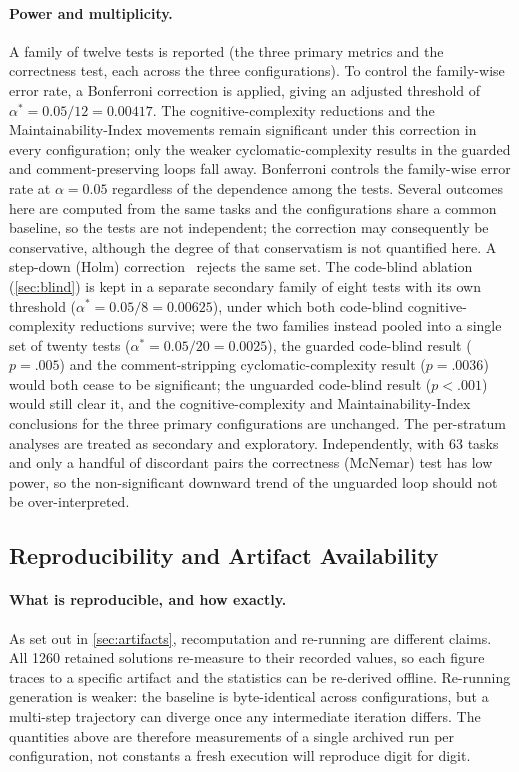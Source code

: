 \paragraph{Power and multiplicity.} A family of twelve tests is
reported (the three primary metrics and the correctness test, each across the
three configurations). To control the family-wise error rate, a Bonferroni
correction is applied, giving an adjusted threshold of
$\alpha^\ast = 0.05/12 = 0.00417$. The cognitive-complexity reductions and the
Maintainability-Index movements remain significant under this correction in every
configuration; only the weaker cyclomatic-complexity results in the guarded and
comment-preserving loops fall away. Bonferroni controls the family-wise error rate
at $\alpha = 0.05$ regardless of the dependence among the tests. Several outcomes
here are computed from the same tasks and the configurations share a common
baseline, so the tests are not independent; the correction may consequently be
conservative, although the degree of that conservatism is not quantified here. A
step-down (Holm) correction~\citep{holm1979} rejects the
same set. The
code-blind ablation (\cref{sec:blind}) is kept in a separate secondary family of
eight tests with its own threshold ($\alpha^\ast = 0.05/8 = 0.00625$), under
which both code-blind cognitive-complexity reductions survive; were the two
families instead pooled into a single set of twenty tests
($\alpha^\ast = 0.05/20 = 0.0025$), the guarded code-blind result ($p=.005$) and the
comment-stripping cyclomatic-complexity result ($p=.0036$) would both cease to be significant; the unguarded code-blind result ($p<.001$)
would still clear it, and the cognitive-complexity and Maintainability-Index
conclusions for the three primary configurations are unchanged. The per-stratum
analyses are treated as secondary and exploratory. Independently, with 63 tasks
and only a handful of discordant pairs the correctness (McNemar) test has low
power, so the non-significant downward trend of the unguarded loop should not be
over-interpreted.

\subsection{Reproducibility and Artifact Availability}
\label{sec:repro}

\paragraph{What is reproducible, and how exactly.} As set out in
\cref{sec:artifacts}, recomputation and re-running are different claims. All 1260
retained solutions re-measure to their recorded values, so each figure traces to a
specific artifact and the statistics can be re-derived offline. Re-running
generation is weaker: the baseline is byte-identical across configurations, but a
multi-step trajectory can diverge once any intermediate iteration differs. The
quantities above are therefore measurements of a single archived run per
configuration, not constants a fresh execution will reproduce digit for digit.

